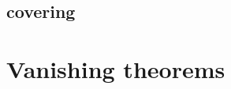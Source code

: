 \documentclass{article}
\begin{document}
\subsection{covering}





\section{Vanishing theorems}
\end{document}
